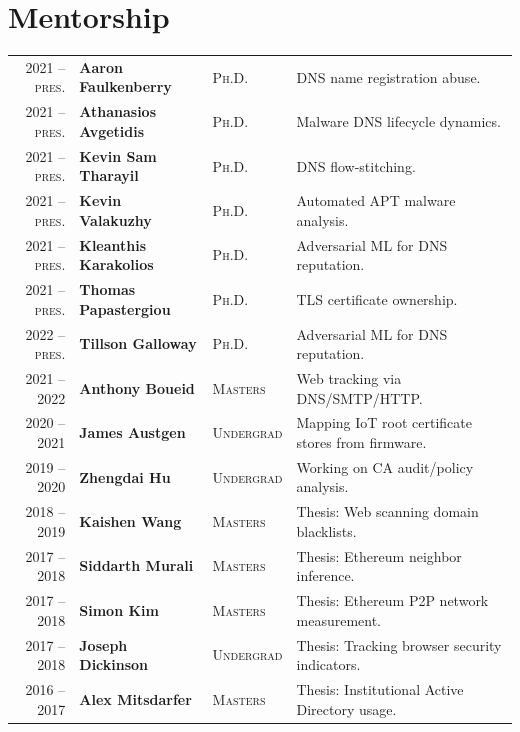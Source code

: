 \documentclass[10pt,singlecolumn]{article} %
\begin{document}
\section{Mentorship} 
\begin{tabular}{rlll}
2021 -- \textsc{pres.} & \textbf{Aaron Faulkenberry} & \textsc{Ph.D.} & DNS name registration abuse.\\ 
2021 -- \textsc{pres.} & \textbf{Athanasios Avgetidis} & \textsc{Ph.D.} & Malware DNS lifecycle dynamics.\\ 
2021 -- \textsc{pres.} & \textbf{Kevin Sam Tharayil} & \textsc{Ph.D.} & DNS flow-stitching.\\ 
2021 -- \textsc{pres.} & \textbf{Kevin Valakuzhy} & \textsc{Ph.D.} & Automated APT malware analysis.\\ 
2021 -- \textsc{pres.} & \textbf{Kleanthis Karakolios} & \textsc{Ph.D.} & Adversarial ML for DNS reputation.\\ 
2021 -- \textsc{pres.} & \textbf{Thomas Papastergiou} & \textsc{Ph.D.} & TLS certificate ownership.\\ 
2022 -- \textsc{pres.} & \textbf{Tillson Galloway} & \textsc{Ph.D.} & Adversarial ML for DNS reputation.\\ 
2021 -- 2022			 & \textbf{Anthony Boueid} & \textsc{Masters} & Web tracking via DNS/SMTP/HTTP.\\ 
2020 -- 2021             & \textbf{James Austgen} & \textsc{Undergrad} & Mapping IoT root certificate stores from firmware.\\ 
2019 -- 2020	         & \textbf{Zhengdai Hu} & \textsc{Undergrad} & Working on CA audit/policy analysis.\\ 
2018 -- 2019	         & \textbf{Kaishen Wang} & \textsc{Masters} & Thesis: Web scanning domain blacklists.\\
2017 -- 2018	         & \textbf{Siddarth Murali} & \textsc{Masters} & Thesis: Ethereum neighbor inference.\\ 
2017 -- 2018	         & \textbf{Simon Kim} & \textsc{Masters} & Thesis: Ethereum P2P network measurement.\\  
2017 -- 2018	         & \textbf{Joseph Dickinson} & \textsc{Undergrad} & Thesis: Tracking browser security indicators.\\  
2016 -- 2017	         & \textbf{Alex Mitsdarfer} & \textsc{Masters} & Thesis: Institutional Active Directory usage.\\ 
\end{tabular}\\
\end{document}
